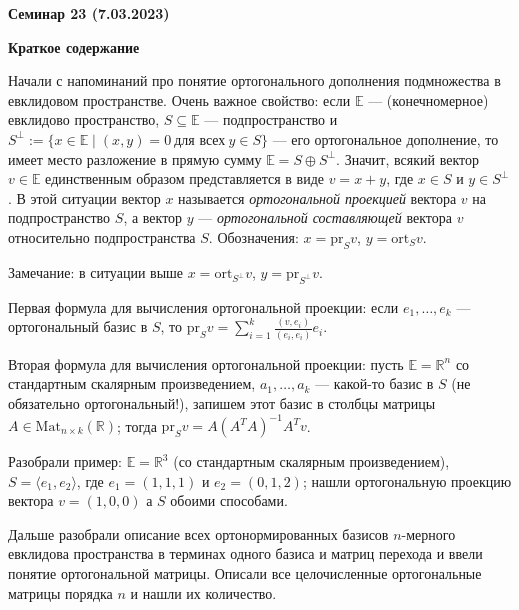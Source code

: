 \documentclass[10pt, a4paper]{extarticle}
\def \R{\mathbb{R}}
\theoremstyle{definition}
\begin{document}
\begin{center}
\small
\noindent{}
\end{center}

\large

\begin{center}
\textbf{Семинар 23 (7.03.2023)}
\end{center}

\textbf{Краткое содержание}

Начали с напоминаний про понятие ортогонального дополнения подмножества в евклидовом пространстве.
Очень важное свойство: если $\mathbb E$ --- (конечномерное) евклидово пространство, $S \subseteq \mathbb E$ --- подпространство и $S^\perp := \lbrace x \in \mathbb E \mid (x,y) = 0 \ \text{для всех} \ y \in S \rbrace$ --- его ортогональное дополнение, то имеет место разложение в прямую сумму $\mathbb E = S \oplus S^\perp$.
Значит, всякий вектор $v \in \mathbb E$ единственным образом представляется в виде $v = x + y$, где $x \in S$ и $y \in S^\perp$.
В этой ситуации вектор $x$ называется \textit{ортогональной проекцией} вектора $v$ на подпространство $S$, а вектор $y$ --- \textit{ортогональной составляющей} вектора $v$ относительно подпространства $S$.
Обозначения: $x = \mathrm{pr}_S v$, $y = \mathrm{ort}_S v$.

Замечание: в ситуации выше $x = \mathrm{ort}_{S^\perp} v$, $y = \mathrm{pr}_{S^\perp} v$.

Первая формула для вычисления ортогональной проекции: если $e_1, \dots, e_k$ --- ортогональный базис в $S$, то $\mathrm{pr}_Sv = \sum \limits_{i=1}^k \frac{(v,e_i)}{(e_i,e_i)}e_i$.

Вторая формула для вычисления ортогональной проекции: пусть $\mathbb E = \R^n$ со стандартным скалярным произведением, $a_1,\dots,a_k$ --- какой-то базис в $S$ (не обязательно ортогональный!), запишем этот базис в столбцы матрицы $A \in \mathrm{Mat}_{n \times k}(\R)$; тогда $\mathrm{pr}_S v = A(A^TA)^{-1}A^Tv$.

Разобрали пример: $\mathbb E = \R^3$ (со стандартным скалярным произведением), $S = \langle e_1, e_2 \rangle$, где $e_1 = (1,1,1)$ и $e_2 = (0,1,2)$; нашли ортогональную проекцию вектора $v = (1,0,0)$ а $S$ обоими способами.

Дальше разобрали описание всех ортонормированных базисов $n$-мерного евклидова пространства в терминах одного базиса и матриц перехода и ввели понятие ортогональной матрицы.
Описали все целочисленные ортогональные матрицы порядка $n$ и нашли их количество.
\end{document}
